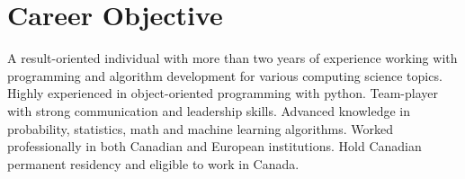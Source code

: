 \documentclass[letter,11pt]{article}
\begin{document}

\section{Career Objective}
A result-oriented individual with more than two years of experience working with programming and algorithm development for various computing science topics. Highly experienced in object-oriented programming with python. Team-player with strong communication and leadership skills. Advanced knowledge in probability, statistics, math and machine learning algorithms. Worked professionally in both Canadian and European institutions. Hold Canadian permanent residency and eligible to work in Canada.
\end{document}

